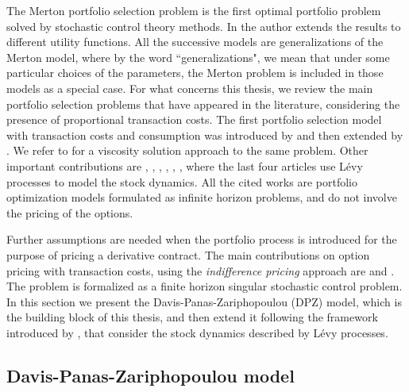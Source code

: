 \noindent
The Merton portfolio selection problem is the first optimal portfolio problem solved by stochastic control theory methods. 
In \cite{Me71} the author extends the results to different utility functions.
All the successive models are generalizations of the Merton model, where by 
the word ``generalizations", we mean that under some particular choices of the parameters, the Merton problem is included in those models as a special case.
For what concerns this thesis, we review the main portfolio selection problems that have appeared in the literature, considering the presence of proportional transaction costs.
The first portfolio selection model with transaction costs and consumption was introduced by \cite{Co86} and then extended by \cite{DaNo90}. We refer to \cite{ShSo94}
for a viscosity solution approach to the same problem. 
Other important contributions are 
\cite{DaYi09}, \cite{Dai10}, \cite{LiuLo02}, \cite{LiuLo07}, \cite{BKR01}, \cite{OkSu01}, \cite{Kab16} where the last four articles use Lévy processes to model the stock dynamics. 
All the cited works are portfolio optimization models formulated as infinite horizon problems, and do not involve the pricing of the options.

Further assumptions are needed when the portfolio process is introduced for the purpose of pricing a derivative contract.
The main contributions on option pricing with transaction costs, using the \emph{indifference pricing} approach are
\cite{HoNe89} and \cite{DaPaZa93}. The problem is formalized as a finite horizon singular stochastic control problem.
In this section we present the Davis-Panas-Zariphopoulou (DPZ) model, 
which is the building block of this thesis, and then extend it following the framework introduced by \cite{Kab16}, 
that consider the stock dynamics described by Lévy processes.



\subsection{Davis-Panas-Zariphopoulou model}\label{DPZ_sec}

